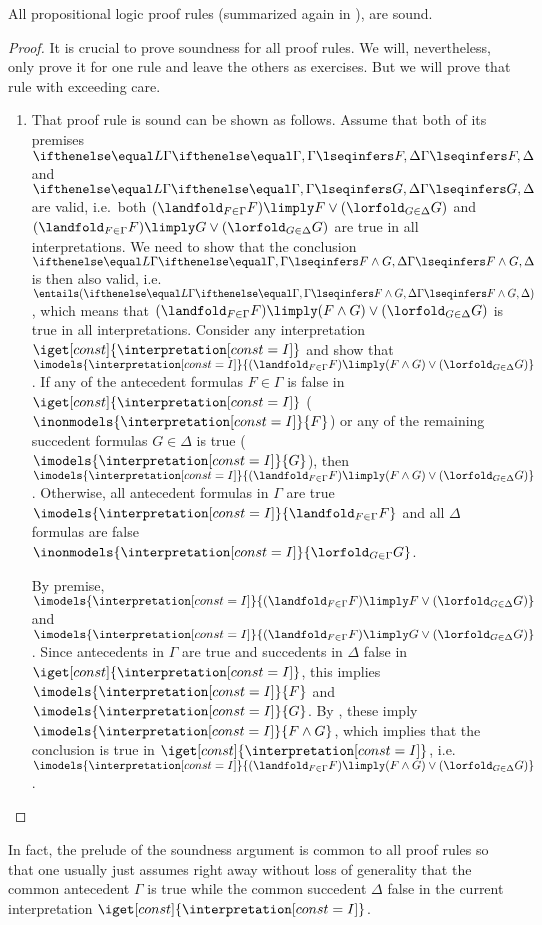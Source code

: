 \documentclass[11pt,twoside]{scrartcl}
\newcommand{\I}{\interpretation[const=I]}
\newcommand{\asfml}{F}
\newcommand{\bsfml}{G}
\begin{document}
\begin{lemma} \label{lem:sound-proof-rule}
All propositional logic proof rules (summarized again in ), are sound.
\end{lemma}
\begin{proof}
It is crucial to prove soundness for all proof rules.
We will, nevertheless, only prove it for one rule and leave the others as exercises.
But we will prove that rule with exceeding care.
\begin{enumerate}
\item[\irref{andr}] That proof rule  is sound can be shown as follows.
Assume that both of its premises \(\lsequent{\Gamma}{\asfml,\Delta}\) and \(\lsequent{\Gamma}{\bsfml,\Delta}\) are valid, i.e.\ both 
\((\landfold_{F\in\Gamma} F) \limply \asfml\lor(\lorfold_{G\in\Delta} G)\)
and \((\landfold_{F\in\Gamma} F) \limply \bsfml\lor(\lorfold_{G\in\Delta} G)\)
are true in all interpretations.
We need to show that the conclusion \(\lsequent{\Gamma}{\asfml\land\bsfml,\Delta}\) is then also valid, i.e.\ \(\entails (\lsequent{\Gamma}{\asfml\land\bsfml,\Delta})\), which means that \((\landfold_{F\in\Gamma} F) \limply (\asfml\land\bsfml)\lor(\lorfold_{G\in\Delta} G)\) is true in all interpretations.
Consider any interpretation $\iget[const]{\I}$ and show that 
\(\imodels{\I}{(\landfold_{F\in\Gamma} F) \limply (\asfml\land\bsfml)\lor(\lorfold_{G\in\Delta} G)}\).
If any of the antecedent formulas $F\in\Gamma$ is false in $\iget[const]{\I}$ (\(\inonmodels{\I}{F}\)) or any of the remaining succedent formulas $G\in\Delta$ is true (\(\imodels{\I}{G}\)), 
then 
\(\imodels{\I}{(\landfold_{F\in\Gamma} F) \limply (\asfml\land\bsfml)\lor(\lorfold_{G\in\Delta} G)}\).
Otherwise, all antecedent formulas in $\Gamma$ are true \(\imodels{\I}{\landfold_{F\in\Gamma} F}\) and all $\Delta$ formulas are false \(\inonmodels{\I}{\lorfold_{G\in\Gamma} G}\).

By premise, 
\(\imodels{\I}{(\landfold_{F\in\Gamma} F) \limply \asfml\lor(\lorfold_{G\in\Delta} G)}\)
and
\(\imodels{\I}{(\landfold_{F\in\Gamma} F) \limply \bsfml\lor(\lorfold_{G\in\Delta} G)}\).
Since antecedents in $\Gamma$ are true and succedents in $\Delta$ false in $\iget[const]{\I}$, this implies
\(\imodels{\I}{\asfml}\) and \(\imodels{\I}{\bsfml}\).
By , these imply
\(\imodels{\I}{\asfml\land\bsfml}\), which implies that the conclusion is true in $\iget[const]{\I}$, i.e.\
\(\imodels{\I}{(\landfold_{F\in\Gamma} F) \limply (\asfml\land\bsfml)\lor(\lorfold_{G\in\Delta} G)}\).
\qedhere
\end{enumerate}
\end{proof}
In fact, the prelude of the soundness argument is common to all proof rules so that one usually just assumes right away without loss of generality that the common antecedent $\Gamma$ is true while the common succedent $\Delta$ false in the current interpretation $\iget[const]{\I}$.
\end{document}
